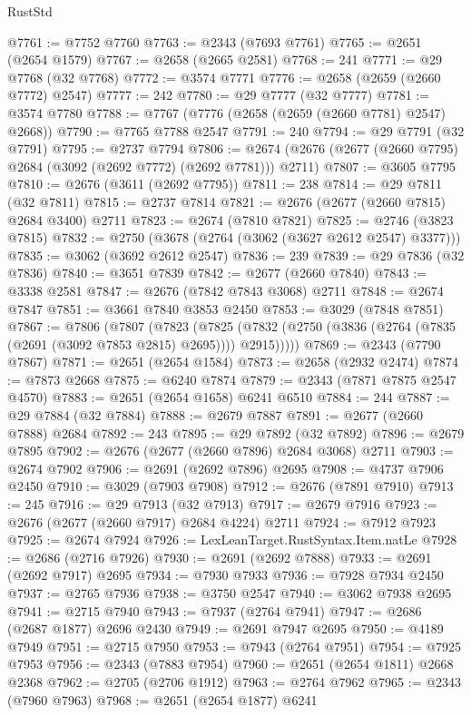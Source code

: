 \begin{lexlean}{RustStd}
\begin{coremodule}
{\begin{coremodule}
{{{{{{{{{{{{{{{{{{{{{{{{{{{{{{{{{{{{{{{{{{{{{{{{{{{{{{{@7761 := @7752 @7760
@7763 := @2343 (@7693 @7761)
@7765 := @2651 (@2654 @1579)
@7767 := @2658 (@2665 @2581)
@7768 := 241
@7771 := @29 @7768 (@32 @7768)
@7772 := @3574 @7771
@7776 := @2658 (@2659 (@2660 @7772) @2547)
@7777 := 242
@7780 := @29 @7777 (@32 @7777)
@7781 := @3574 @7780
@7788 := @7767 (@7776 (@2658 (@2659 (@2660 @7781) @2547) @2668))
@7790 := @7765 @7788 @2547
@7791 := 240
@7794 := @29 @7791 (@32 @7791)
@7795 := @2737 @7794
@7806 := @2674 (@2676 (@2677 (@2660 @7795) @2684 (@3092 (@2692 @7772) (@2692 @7781))) @2711)
@7807 := @3605 @7795
@7810 := @2676 (@3611 (@2692 @7795))
@7811 := 238
@7814 := @29 @7811 (@32 @7811)
@7815 := @2737 @7814
@7821 := @2676 (@2677 (@2660 @7815) @2684 @3400) @2711
@7823 := @2674 (@7810 @7821)
@7825 := @2746 (@3823 @7815)
@7832 := @2750 (@3678 (@2764 (@3062 (@3627 @2612 @2547) @3377)))
@7835 := @3062 (@3692 @2612 @2547)
@7836 := 239
@7839 := @29 @7836 (@32 @7836)
@7840 := @3651 @7839
@7842 := @2677 (@2660 @7840)
@7843 := @3338 @2581
@7847 := @2676 (@7842 @7843 @3068) @2711
@7848 := @2674 @7847
@7851 := @3661 @7840 @3853 @2450
@7853 := @3029 (@7848 @7851)
@7867 := @7806
    (@7807
      (@7823
        (@7825 (@7832 (@2750 (@3836 (@2764 (@7835 (@2691 (@3092 @7853 @2815) @2695)))) @2915)))))
@7869 := @2343 (@7790 @7867)
@7871 := @2651 (@2654 @1584)
@7873 := @2658 (@2932 @2474)
@7874 := @7873 @2668
@7875 := @6240 @7874
@7879 := @2343 (@7871 @7875 @2547 @4570)
@7883 := @2651 (@2654 @1658) @6241 @6510
@7884 := 244
@7887 := @29 @7884 (@32 @7884)
@7888 := @2679 @7887
@7891 := @2677 (@2660 @7888) @2684
@7892 := 243
@7895 := @29 @7892 (@32 @7892)
@7896 := @2679 @7895
@7902 := @2676 (@2677 (@2660 @7896) @2684 @3068) @2711
@7903 := @2674 @7902
@7906 := @2691 (@2692 @7896) @2695
@7908 := @4737 @7906 @2450
@7910 := @3029 (@7903 @7908)
@7912 := @2676 (@7891 @7910)
@7913 := 245
@7916 := @29 @7913 (@32 @7913)
@7917 := @2679 @7916
@7923 := @2676 (@2677 (@2660 @7917) @2684 @4224) @2711
@7924 := @7912 @7923
@7925 := @2674 @7924
@7926 := LexLeanTarget.RustSyntax.Item.natLe
@7928 := @2686 (@2716 @7926)
@7930 := @2691 (@2692 @7888)
@7933 := @2691 (@2692 @7917) @2695
@7934 := @7930 @7933
@7936 := @7928 @7934 @2450
@7937 := @2765 @7936
@7938 := @3750 @2547
@7940 := @3062 @7938 @2695
@7941 := @2715 @7940
@7943 := @7937 (@2764 @7941)
@7947 := @2686 (@2687 @1877) @2696 @2430
@7949 := @2691 @7947 @2695
@7950 := @4189 @7949
@7951 := @2715 @7950
@7953 := @7943 (@2764 @7951)
@7954 := @7925 @7953
@7956 := @2343 (@7883 @7954)
@7960 := @2651 (@2654 @1811) @2668 @2368
@7962 := @2705 (@2706 @1912)
@7963 := @2764 @7962
@7965 := @2343 (@7960 @7963)
@7968 := @2651 (@2654 @1877) @6241
}}}}}}}}}}}}}}}}}}}}}}}}}}}}}}}}}}}}}}}}}}}}}}}}}}}}}}}
\end{coremodule}}
\end{coremodule}
\end{lexlean}
